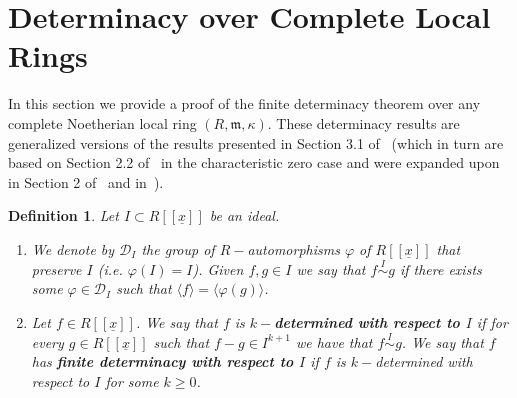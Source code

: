 \documentclass{article}
\newtheorem{definition}[theorem]{Definition}
\newcommand{\equivd}{\overset{I}{\sim}}
\numberwithin{theorem}{section}
\begin{document}
\section{Determinacy over Complete Local Rings}\label{appendix_Det}


In this section we provide a proof of the finite determinacy theorem over any complete Noetherian local ring $(R, \mathfrak{m}, \kappa)$. These determinacy results are generalized versions of the results presented in Section 3.1 of~\cite{boubakri2009hypersurface} (which in turn are based on Section 2.2 of~\cite{greuel2007introduction} in the characteristic zero case and were expanded upon in Section 2 of~\cite{boubakri2012invariants} and in~\cite{greuel2019finite}). 


\begin{definition}\label{def:determinacy}
Let $I \subset R[[\underline{x}]]$ be an ideal.
\begin{enumerate}
    \item We denote by $\mathcal{D}_I$ the group of $R-$automorphisms $\varphi$ of $R[[\underline{x}]]$ that preserve $I$ (i.e. $\varphi(I)=I$). Given $f,g \in I$ we say that $f \equivd g$ if there exists some $\varphi \in \mathcal{D}_I$ such that $\langle f \rangle = \langle \varphi(g) \rangle$. 
    \item  Let $f \in R[[\underline{x}]]$. We say that $f$ is \textbf{$k-$determined with respect to $I$} if for every $g \in R[[\underline{x}]]$ such that $f-g \in I^{k+1}$ we have that $f \equivd g$. We say that $f$ has \textbf{finite determinacy with respect to $I$} if $f$ is $k-$determined with respect to $I$ for some $k \geq 0$.
\end{enumerate} 
\end{definition}
\end{document}
